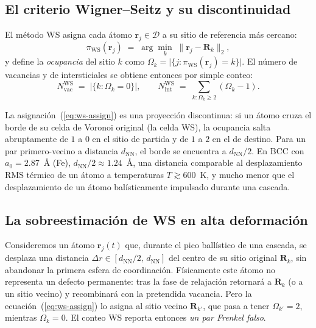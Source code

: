 \documentclass[11pt,a4paper]{article}
\theoremstyle{remark}
\begin{document}
\subsection{El criterio Wigner--Seitz y su discontinuidad}

El método WS \cite{Stukowski2010,Nordlund2018} asigna cada átomo
$\mathbf{r}_j \in \mathcal{D}$ a su sitio de referencia más cercano:
\begin{equation}
  \pi_\text{WS}(\mathbf{r}_j) \;=\; \arg\min_{k} \;
  \bigl\| \mathbf{r}_j - \mathbf{R}_k \bigr\|_2,
  \label{eq:ws-assign}
\end{equation}
y define la \emph{ocupancia} del sitio $k$ como
$\Omega_k = \bigl| \{ j : \pi_\text{WS}(\mathbf{r}_j) = k \} \bigr|$. El
número de vacancias y de intersticiales se obtiene entonces por simple
conteo:
\begin{equation}
  N_\text{vac}^\text{WS} \;=\; \bigl|\{ k : \Omega_k = 0 \}\bigr|,
  \qquad
  N_\text{int}^\text{WS} \;=\; \sum_{k : \Omega_k \geq 2}\!(\Omega_k - 1).
  \label{eq:ws-count}
\end{equation}

La asignación~(\ref{eq:ws-assign}) es una proyección discontinua: si un
átomo cruza el borde de su celda de Voronoi original (la celda WS), la
ocupancia salta abruptamente de $1$ a $0$ en el sitio de partida y de $1$
a $2$ en el de destino. Para un par primero-vecino a distancia $d_\text{NN}$,
el borde se encuentra a $d_\text{NN}/2$. En BCC con $a_0 = 2.87$~Å (Fe),
$d_\text{NN}/2 \approx 1.24$~Å, una distancia comparable al desplazamiento
RMS térmico de un átomo a temperaturas $T \gtrsim 600$~K, y mucho menor
que el desplazamiento de un átomo balísticamente impulsado durante una
cascada.

\subsection{La sobreestimación de WS en alta deformación}
\label{sec:ws-overest}

Consideremos un átomo $\mathbf{r}_j(t)$ que, durante el pico ballístico
de una cascada, se desplaza una distancia $\Delta r \in
[d_\text{NN}/2,\, d_\text{NN}]$ del centro de su sitio original
$\mathbf{R}_k$, sin abandonar la primera esfera de coordinación.
Físicamente este átomo no representa un defecto permanente: tras la
fase de relajación retornará a $\mathbf{R}_k$ (o a un sitio vecino) y
recombinará con la pretendida vacancia. Pero la
ecuación~(\ref{eq:ws-assign}) lo asigna al sitio vecino $\mathbf{R}_{k'}$,
que pasa a tener $\Omega_{k'} = 2$, mientras $\Omega_k = 0$. El conteo
WS reporta entonces \emph{un par Frenkel falso}.
\end{document}
